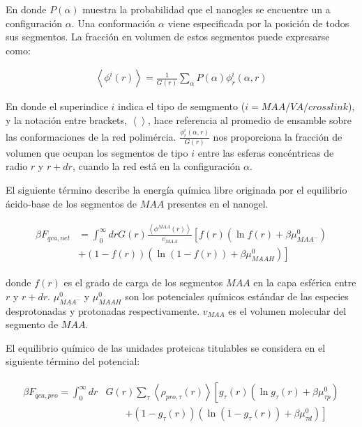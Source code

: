 \noindent En donde $P(\alpha)$ muestra la probabilidad que el nanogles se encuentre un a configuraci\'on $\alpha$.
Una conformaci\'on $\alpha$ viene especificada por la posici\'on de todos sus segmentos. 
La fracci\'on en volumen de estos segmentos puede expresarse como:

\begin{align}
	\left< \phi^i(r)\right> = \frac{1}{G(r)} \sum_\alpha{P(\alpha)\phi^i_r(\alpha,r)} 
	\label{eq:esf:ensamble-gel}
\end{align}

En donde el superindice $i$ indica el tipo de semgmento ($i = MAA/VA/crosslink$), y la notaci\'on entre brackets, $\left<\right>$,   hace referencia al promedio de ensamble sobre las conformaciones de la red polim\'ercia. 
$\frac{\phi^i_r(\alpha,r)}{G(r)}$  nos proporciona la fracci\'on de volumen que ocupan los segmentos de tipo $i$ entre las esferas conc\'entricas de radio $r$ y $r + dr$, cuando la red est\'a en la configuraci\'on $\alpha$.




El siguiente t\'ermino describe la energ\'ia qu\'imica libre originada por el equilibrio \'acido-base de los segmentos de $MAA$ presentes en el nanogel.

\begin{align}
	\begin{aligned}
		\beta F_{qca,net} &= \int_0^\infty drG(r) \frac{\left<\phi^{MAA}(r)\right>}{v_{MAA}} \left[f(r)(\ln f(r)+ \beta\mu^0_{MAA^-})\right.\\
		&\left.+(1-f(r))(\ln (1-f(r))+\beta\mu^0_{MAAH})\right]    
	\end{aligned}
\end{align} 


\noindent donde $f(r)$ es el grado de carga de los segmentos $MAA$ en la capa esf\'erica entre $r$ y $r + dr$.
$\mu^0_{MAA^-}$ y $\mu^0_{MAAH}$ son los potenciales qu\'imicos est\'andar de las especies desprotonadas y protonadas respectivamente. $v_{MAA}$ es el volumen molecular del segmento de $MAA$.



El equilibrio qu\'imico de las unidades proteicas titulables se considera en el siguiente t\'ermino del potencial:

\begin{align}
	\begin{aligned}
		\beta F_{qca,pro} =\int_0^\infty dr &G(r) \sum_\tau \left<\rho_{pro,\tau}(r)\right> \left[g_\tau(r)(\ln g_\tau(r)+ \beta\mu^0_{\tau p})\right.\\
		&\qquad\left.+(1-g_\tau(r))(\ln (1-g_\tau(r))+\beta\mu^0_{\tau d})\right]
		\label{eq:esf:fca-pro}   
	\end{aligned}
\end{align} 

